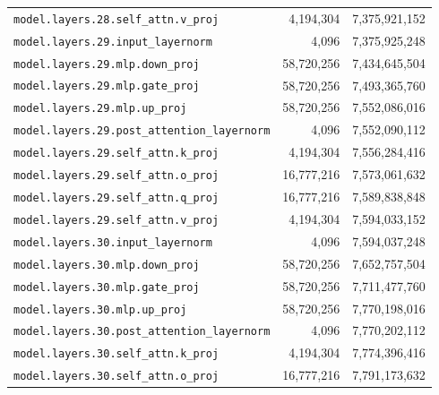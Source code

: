 \documentclass[10pt,a4paper]{article}
\theoremstyle{definition}
\begin{document}
\begin{appendices}
\begin{longtable}{p{9.5cm}rr}
\texttt{model.\allowbreak{}layers.\allowbreak{}28.\allowbreak{}self\_attn.\allowbreak{}v\_proj} & 4,194,304 & 7,375,921,152 \\
\texttt{model.\allowbreak{}layers.\allowbreak{}29.\allowbreak{}input\_layernorm} & 4,096 & 7,375,925,248 \\
\texttt{model.\allowbreak{}layers.\allowbreak{}29.\allowbreak{}mlp.\allowbreak{}down\_proj} & 58,720,256 & 7,434,645,504 \\
\texttt{model.\allowbreak{}layers.\allowbreak{}29.\allowbreak{}mlp.\allowbreak{}gate\_proj} & 58,720,256 & 7,493,365,760 \\
\texttt{model.\allowbreak{}layers.\allowbreak{}29.\allowbreak{}mlp.\allowbreak{}up\_proj} & 58,720,256 & 7,552,086,016 \\
\texttt{model.\allowbreak{}layers.\allowbreak{}29.\allowbreak{}post\_attention\_layernorm} & 4,096 & 7,552,090,112 \\
\texttt{model.\allowbreak{}layers.\allowbreak{}29.\allowbreak{}self\_attn.\allowbreak{}k\_proj} & 4,194,304 & 7,556,284,416 \\
\texttt{model.\allowbreak{}layers.\allowbreak{}29.\allowbreak{}self\_attn.\allowbreak{}o\_proj} & 16,777,216 & 7,573,061,632 \\
\texttt{model.\allowbreak{}layers.\allowbreak{}29.\allowbreak{}self\_attn.\allowbreak{}q\_proj} & 16,777,216 & 7,589,838,848 \\
\texttt{model.\allowbreak{}layers.\allowbreak{}29.\allowbreak{}self\_attn.\allowbreak{}v\_proj} & 4,194,304 & 7,594,033,152 \\
\texttt{model.\allowbreak{}layers.\allowbreak{}30.\allowbreak{}input\_layernorm} & 4,096 & 7,594,037,248 \\
\texttt{model.\allowbreak{}layers.\allowbreak{}30.\allowbreak{}mlp.\allowbreak{}down\_proj} & 58,720,256 & 7,652,757,504 \\
\texttt{model.\allowbreak{}layers.\allowbreak{}30.\allowbreak{}mlp.\allowbreak{}gate\_proj} & 58,720,256 & 7,711,477,760 \\
\texttt{model.\allowbreak{}layers.\allowbreak{}30.\allowbreak{}mlp.\allowbreak{}up\_proj} & 58,720,256 & 7,770,198,016 \\
\texttt{model.\allowbreak{}layers.\allowbreak{}30.\allowbreak{}post\_attention\_layernorm} & 4,096 & 7,770,202,112 \\
\texttt{model.\allowbreak{}layers.\allowbreak{}30.\allowbreak{}self\_attn.\allowbreak{}k\_proj} & 4,194,304 & 7,774,396,416 \\
\texttt{model.\allowbreak{}layers.\allowbreak{}30.\allowbreak{}self\_attn.\allowbreak{}o\_proj} & 16,777,216 & 7,791,173,632 \\

\end{longtable}
\end{appendices}
\end{document}
